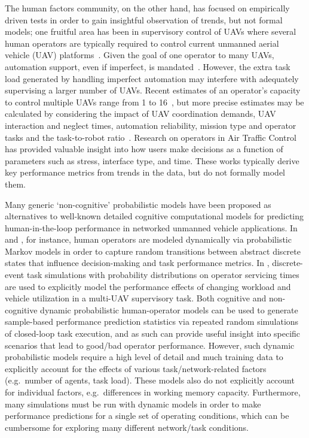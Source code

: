 The human factors community, on the other hand, has focused on empirically driven tests in order to gain insightful observation of trends, but not formal models; one fruitful area has been in supervisory control of UAVs where several human operators are typically required to control current unmanned aerial vehicle (UAV) platforms~\cite{cooke2006human,cummings2007operator}.  Given the goal of one operator to many UAVs, automation support, even if imperfect, is mandated~\cite{barnes2010human,parasuraman2005flexible,parasuraman2009adaptive}. However, the extra task load generated by handling imperfect automation may interfere with adequately supervising a larger number of UAVs. Recent estimates of an operator's capacity to control multiple UAVs range from 1 to 16~\cite{Wickens2006},  
 but more precise estimates may be calculated by considering the impact of UAV coordination demands, UAV interaction and neglect times, automation reliability, mission type and operator tasks and the task-to-robot ratio~\cite{Wickens2006,cummings2008predicting,de2011adaptive,galster2006managing,parasuraman1997humans}. Research on operators in Air Traffic Control~\cite{Galster01a,Rantanen04a} has provided valuable insight into how users make decisions as a function of parameters such as stress, interface type, and time. 
These works typically derive key performance metrics from trends in the data, but do not formally model them. 

Many generic `non-cognitive' probabilistic models have been proposed as alternatives to well-known detailed cognitive computational models for predicting human-in-the-loop performance in networked unmanned vehicle applications. In \cite{Fan10} and \cite{Heger06}, for instance, human operators are modeled dynamically via probabilistic Markov models in order to capture random transitions between abstract discrete states that influence decision-making and task performance metrics. In \cite{Donmez10}, discrete-event task simulations with probability distributions on operator servicing times are used to explicitly model the performance effects of changing workload and vehicle utilization in a multi-UAV supervisory task. Both cognitive and non-cognitive dynamic probabilistic human-operator models can be used to generate sample-based performance prediction statistics via repeated random simulations of closed-loop task execution, and as such can provide useful insight into specific scenarios that lead to good/bad operator performance. However, such dynamic probabilistic models require a high level of detail and much training data to explicitly account for the effects of various task/network-related factors (e.g.\ number of agents, task load). These models also do not explicitly account for individual factors, e.g.\ differences in working memory capacity. Furthermore, many simulations must be run with dynamic models in order to make performance predictions for a single set of operating conditions, which can be cumbersome for exploring many different network/task conditions. 

